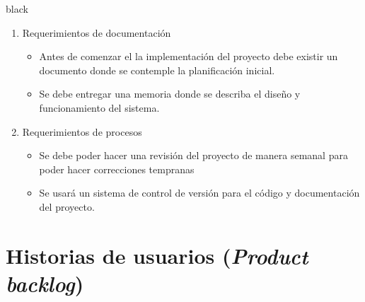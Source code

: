 \documentclass[11pt]{charter}
\begin{document}
\begin{consigna}{black}
\begin{enumerate}
\begin{enumerate}
\begin{enumerate}
	\end{enumerate}
	\item Requerimientos de documentación
	\begin{itemize}
		\item Antes de comenzar el la implementación del proyecto debe existir un documento donde se contemple la planificación inicial.
		\item Se debe entregar una memoria donde se describa el diseño y funcionamiento del sistema.
	\end{itemize}
    \item Requerimientos de procesos
    \begin{itemize}
    	\item Se debe poder hacer una revisión del proyecto de manera semanal para poder hacer correcciones tempranas
    	\item Se usará un sistema de control de versión para el código y documentación del proyecto.
    \end{itemize}
	\end{enumerate}
\end{enumerate}

\end{consigna}

\section{Historias de usuarios (\textit{Product backlog})}
\label{sec:backlog}
\end{document}
